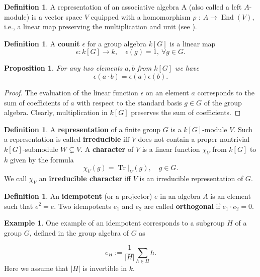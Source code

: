 \documentclass[12pt,reqno]{amsart}
\newtheorem{prop}[thm]{Proposition}
\theoremstyle{definition}
\newtheorem{defn}[thm]{Definition}
\newtheorem{ex}[thm]{Example}
\theoremstyle{remark}
\numberwithin{equation}{section}
\DeclareMathOperator{\tr}{Tr}
\DeclareMathOperator{\End}{End}
\begin{document}
\begin{defn}
    A representation of an associative algebra A (also called a left $A$-module) is a vector space $V$ equipped with a homomorphism $\rho$ : $A \to \End(V)$, i.e., a linear map preserving the multiplication and unit (see \cite{E}). 
\end{defn}

\begin{defn}
    A \textbf{counit} $\epsilon$ for a group algebra $k[G]$ is a linear map
    \[
    \epsilon: k[G] \rightarrow k, \quad \epsilon(g)=1, \ \forall g\in G.
    \]
\end{defn}

\begin{prop}\label{counit}
    For any two elements $a,b$ from $k[G]$ we have
    \[
    \epsilon(a\cdot b)=\epsilon(a)\epsilon(b).
    \]
\end{prop}

\begin{proof}
    The evaluation of the linear function $\epsilon$ on an element $a$ corresponds to the sum of coefficients of $a$ with respect to the standard basis $g\in G$ of the group algebra. Clearly, multiplication in $k[G]$ preserves the sum of coefficients.
\end{proof}

\begin{defn}
    A \textbf{representation} of a finite group $G$ is a $k[G]$-module $V$. Such a representation is called \textbf{irreducible} iff $V$ does not contain a proper nontrivial $k[G]$-submodule $W\subsetneq V$. A \textbf{character} of $V$ is a linear function $\chi_V$ from $k[G]$ to $k$ given by the formula
    \[
    \chi_V(g)=\tr|_V(g), \quad g\in G.
    \]
    We call $\chi_V$ an \textbf{irreducible character} iff $V$ is an irreducible representation of $G$.
\end{defn}

\begin{defn}\label{idempotents}
    An \textbf{idempotent} (or a projector) $e$ in an algebra $A$ is an element such that $e^2 = e$. Two idempotents $e_1$ and $e_2$ are called \textbf{orthogonal} if $e_1 \cdot e_2 = 0$.
\end{defn}

\begin{ex}\label{subgroup-projector}
    One example of an idempotent corresponds to a subgroup $H$ of a group $G$, defined in the group algebra of $G$ as
    
    \begin{equation*}
        e_H:= \frac{1}{|H|}\sum_{h\in H}h.
    \end{equation*}
    Here we assume that $|H|$ is invertible in $k$.
\end{ex}
\end{document}

